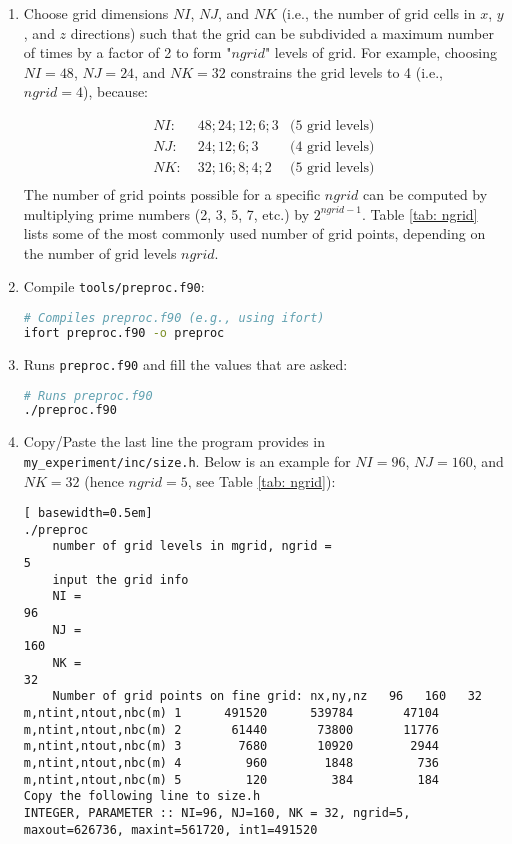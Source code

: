 \documentclass[12pt,letterpaper,titlepage]{article}
\begin{document}
\begin{enumerate}
	\item Choose grid dimensions $NI$, $NJ$, and $NK$ (i.e., the number of grid cells in $x$, $y$, and $z$ directions) such that the grid can be subdivided a maximum number of times by a factor of 2 to form "$ngrid$" levels of grid. For example, choosing $NI=48$, $NJ=24$, and $NK=32$ constrains the grid levels to 4 (i.e., $ngrid = 4$), because:

	\begin{align*} 
		NI:& \; 48; 24; 12; 6; 3 &\text{(5 grid levels)}\\
		NJ:& \; 24; 12; 6; 3 &\text{(4 grid levels)}\\
		NK:& \; 32; 16; 8; 4; 2 &\text{(5 grid levels)}\\
	\end{align*}
	The number of grid points possible for a specific $ngrid$ can be computed by multiplying prime numbers (2, 3, 5, 7, etc.) by $2^{ngrid-1}$. Table \ref{tab: ngrid} lists some of the most commonly used number of grid points, depending on the number of grid levels $ngrid$.

	\item Compile \texttt{tools/preproc.f90}:
\begin{lstlisting}[language=sh]
# Compiles preproc.f90 (e.g., using ifort)
ifort preproc.f90 -o preproc
\end{lstlisting}	
	
	\item Runs \texttt{preproc.f90} and fill the values that are asked:
\begin{lstlisting}[language=sh]
# Runs preproc.f90
./preproc.f90
\end{lstlisting}	

\item Copy/Paste the last line the program provides in \texttt{my\_experiment/inc/size.h}. Below is an example for $NI=96$, $NJ=160$, and $NK=32$ (hence $ngrid=5$, see Table \ref{tab: ngrid}):
\begin{lstlisting}[	basewidth=0.5em]
./preproc
	number of grid levels in mgrid, ngrid = 
5
	input the grid info
	NI = 
96
	NJ = 
160
	NK = 
32
	Number of grid points on fine grid: nx,ny,nz   96   160   32
m,ntint,ntout,nbc(m) 1      491520      539784       47104
m,ntint,ntout,nbc(m) 2       61440       73800       11776
m,ntint,ntout,nbc(m) 3        7680       10920        2944
m,ntint,ntout,nbc(m) 4         960        1848         736
m,ntint,ntout,nbc(m) 5         120         384         184
Copy the following line to size.h
INTEGER, PARAMETER :: NI=96, NJ=160, NK = 32, ngrid=5, maxout=626736, maxint=561720, int1=491520
\end{lstlisting}	
\end{enumerate}
\end{document}
